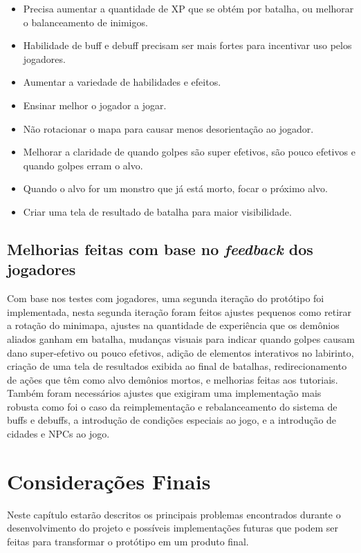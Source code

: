 \documentclass[
	12pt,				%
	openright,			%
	twoside,			%
	a4paper,			%
	english,			%
	french,				%
	spanish,			%
	brazil				%
	]{abntex2}
\begin{document}
\begin{itemize}
\item Precisa aumentar a quantidade de XP que se obtém por batalha, ou melhorar o balanceamento de inimigos.
\item Habilidade de buff e debuff precisam ser mais fortes para incentivar uso pelos jogadores.
\item Aumentar a variedade de habilidades e efeitos.
\item Ensinar melhor o jogador a jogar.
\item Não rotacionar o mapa para causar menos desorientação ao jogador.
\item Melhorar a claridade de quando golpes são super efetivos, são pouco efetivos e quando golpes erram o alvo.
\item Quando o alvo for um monstro que já está morto, focar o próximo alvo.
\item Criar uma tela de resultado de batalha para maior visibilidade.
\end{itemize}

\section{Melhorias feitas com base no \emph{feedback} dos jogadores}

	Com base nos testes com jogadores, uma segunda iteração do protótipo foi implementada, nesta segunda iteração foram feitos ajustes pequenos como retirar a rotação do minimapa, ajustes na quantidade de experiência que os demônios aliados ganham em batalha, mudanças visuais para indicar quando golpes causam dano super-efetivo ou pouco efetivos, adição de elementos interativos no labirinto, criação de uma tela de resultados exibida ao final de batalhas, redirecionamento de ações que têm como alvo demônios mortos, e melhorias feitas aos tutoriais. Também foram necessários ajustes que exigiram uma implementação mais robusta como foi o caso da reimplementação e rebalanceamento do sistema de buffs e debuffs, a introdução de condições especiais ao jogo, e a introdução de cidades e NPCs ao jogo.

\chapter{Considerações Finais}

Neste capítulo estarão descritos os principais problemas encontrados durante o desenvolvimento do projeto e possíveis implementações futuras que podem ser feitas para transformar o protótipo em um produto final.
\end{document}

